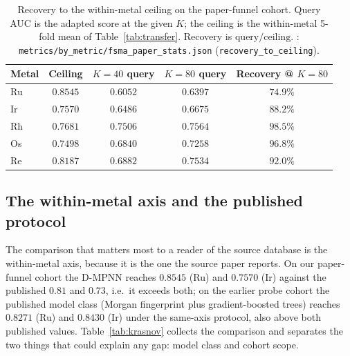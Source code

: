 \begin{table}[t]
\centering
\caption{Recovery to the within-metal ceiling on the paper-funnel cohort.
Query AUC is the adapted \fsma{} score at the given $K$; the ceiling is the
within-metal 5-fold mean of Table~\ref{tab:transfer}. Recovery is
$\text{query}/\text{ceiling}$. \MEASURED:
\texttt{metrics/by\_metric/fsma\_paper\_stats.json}
(\texttt{recovery\_to\_ceiling}).}
\label{tab:ceiling}
\small
\begin{tabular}{lcccc}
\toprule
Metal & Ceiling & $K{=}40$ query & $K{=}80$ query & Recovery @ $K{=}80$ \\
\midrule
Ru & $0.8545$ & $0.6052$ & $0.6397$ & $74.9\%$ \\
Ir & $0.7570$ & $0.6486$ & $0.6675$ & $88.2\%$ \\
Rh & $0.7681$ & $0.7506$ & $0.7564$ & $98.5\%$ \\
Os & $0.7498$ & $0.6840$ & $0.7258$ & $96.8\%$ \\
Re & $0.8187$ & $0.6882$ & $0.7534$ & $92.0\%$ \\
\bottomrule
\end{tabular}
\end{table}

\subsection{The within-metal axis and the published protocol}
\label{sec:results:krasnov}

The comparison that matters most to a reader of the source database is the
within-metal axis, because it is the one the source paper reports. On our
paper-funnel cohort the D-MPNN reaches $0.8545$ (Ru) and $0.7570$ (Ir) against
the published $0.81$ and $0.73$, i.e.\ it exceeds both; on the earlier probe
cohort the published model class (Morgan fingerprint plus gradient-boosted
trees) reaches $0.8271$ (Ru) and $0.8430$ (Ir) under the same-axis protocol,
also above both published values. Table~\ref{tab:krasnov} collects the
comparison and separates the two things that could explain any gap: model class
and cohort scope.

